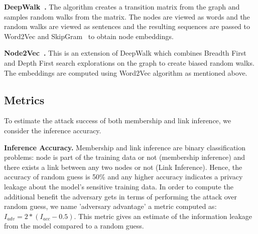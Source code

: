 \noindent\textbf{DeepWalk~\cite{deepwalk}.} The algorithm creates a transition matrix from the graph and samples random walks from the matrix.
The nodes are viewed as words and the random walks are viewed as sentences and the resulting sequences are passed to Word2Vec and SkipGram~\cite{wordemb} to obtain node embeddings.

\noindent\textbf{Node2Vec~\cite{node2vec}.} This is an extension of DeepWalk which combines Breadth First and Depth First search explorations on the graph to create biased random walks.
The embeddings are computed using Word2Vec algorithm as mentioned above.







\subsection{Metrics}


\noindent To estimate the attack success of both membership and link inference, we consider the inference accuracy.

\noindent\textbf{Inference Accuracy.} Membership and link inference are binary classification problems: node is part of the training data or not (membership inference) and there exists a link between any two nodes or not (Link Inference).
Hence, the accuracy of random guess is 50\% and any higher accuracy indicates a privacy leakage about the model's sensitive training data.
In order to compute the additional benefit the adversary gets in terms of performing the attack over random guess, we name 'adversary advantage' a metric computed as: $I_{adv} = 2*(I_{acc}-0.5)$.
This metric gives an estimate of the information leakage from the model compared to a random guess.



